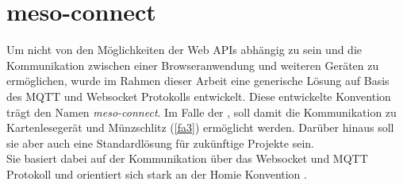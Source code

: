 \section{meso-connect}
\label{sec:meso-connect}

Um nicht von den Möglichkeiten der Web APIs abhängig zu sein und die Kommunikation
zwischen einer Browseranwendung und weiteren Geräten zu ermöglichen, wurde im Rahmen dieser
Arbeit eine generische Lösung auf Basis des MQTT und Websocket Protokolls entwickelt.
Diese entwickelte Konvention trägt den Namen \emph{meso-connect}.
Im Falle der \shst{}, soll damit die Kommunikation zu Kartenlesegerät und Münzschlitz (\ref{fa3})
ermöglicht werden. Darüber hinaus soll sie aber auch eine Standardlösung für zukünftige 
Projekte sein. \\
Sie basiert dabei auf der Kommunikation über das Websocket und MQTT Protokoll und orientiert sich stark an 
der Homie Konvention \cite{homie}.



